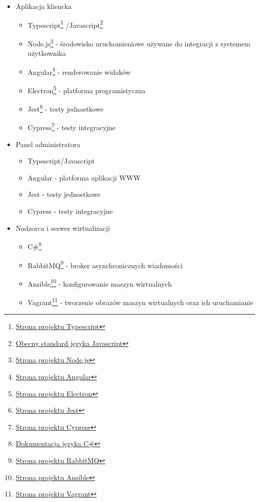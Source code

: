 \documentclass[../opis-rozwiazania.tex]{subfiles}
\begin{document}
\begin{itemize}
    \item Aplikacja kliencka
          \begin{itemize}
              \item Typescript\footnote{\href{https://www.typescriptlang.org}{Strona projektu Typescript}}
                    /Javascript\footnote{\href{https://www.ecma-international.org/publications-and-standards/standards/ecma-262}{Obecny standard języka Javascript}}
              \item Node.js\footnote{\href{https://nodejs.org/en}{Strona projektu Node.js}} - środowisko uruchomieniowe używane do integracji z systemem użytkownika
              \item Angular\footnote{\href{https://angular.io/}{Strona projektu Angular}} - renderowanie widoków
              \item Electron\footnote{\href{https://www.electronjs.org/}{Strona projektu Electron}} - platforma programistyczna
              \item Jest\footnote{\href{https://jestjs.io/}{Strona projektu Jest}} - testy jednostkowe
              \item Cypress\footnote{\href{https://www.cypress.io/}{Strona projektu Cypress}} - testy integracyjne
          \end{itemize}
    \item Panel administratora
          \begin{itemize}
              \item Typescript/Javascript
              \item Angular - platforma aplikacji WWW
              \item Jest - testy jednostkowe
              \item Cypress - testy integracyjne
          \end{itemize}
    \item Nadzorca i serwer wirtualizacji
          \begin{itemize}
              \item C\#\footnote{\href{https://docs.microsoft.com/en-us/dotnet/csharp/}{Dokumentacja języka C\#}}
              \item RabbitMQ\footnote{\href{https://www.rabbitmq.com/}{Strona projektu RabbitMQ}} - broker asynchronicznych wiadomości
              \item Ansible\footnote{\href{https://www.ansible.com/}{Strona projektu Ansible}} - konfigurowanie maszyn wirtualnych
              \item Vagrant\footnote{\href{https://www.vagrantup.com/}{Strona projektu Vagrant}} - tworzenie obrazów maszyn wirtualnych oraz ich uruchamianie

\end{itemize}
\end{itemize}
\end{document}
